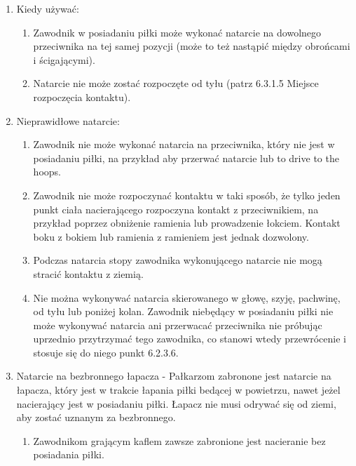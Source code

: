 \documentclass[12pt]{article}
\begin{document}
\begin{enumerate}
	\item
	      Kiedy używać:

	      \begin{enumerate}
		      \item
		            Zawodnik w posiadaniu piłki może wykonać natarcie na dowolnego
		            przeciwnika na tej samej pozycji (może to też nastąpić między
		            obrońcami i ścigającymi).
		      \item
		            Natarcie nie może zostać rozpoczęte od tyłu (patrz 6.3.1.5 Miejsce
		            rozpoczęcia kontaktu).
	      \end{enumerate}
	\item
	      Nieprawidłowe natarcie:

	      \begin{enumerate}
		      \item
		            Zawodnik nie może wykonać natarcia na przeciwnika, który nie jest w
		            posiadaniu piłki, na przykład aby przerwać natarcie lub to drive to
		            the hoops.
		      \item
		            Zawodnik nie może rozpoczynać kontaktu w taki sposób, że tylko jeden
		            punkt ciała nacierającego rozpoczyna kontakt z przeciwnikiem, na
		            przykład poprzez obniżenie ramienia lub prowadzenie łokciem. Kontakt
		            boku z bokiem lub ramienia z ramieniem jest jednak dozwolony.
		      \item
		            Podczas natarcia stopy zawodnika wykonującego natarcie nie mogą
		            stracić kontaktu z ziemią.
		      \item
		            Nie można wykonywać natarcia skierowanego w głowę, szyję, pachwinę,
		            od tyłu lub poniżej kolan. Zawodnik niebędący w posiadaniu piłki nie
		            może wykonywać natarcia ani przerwacać przeciwnika nie próbując
		            uprzednio przytrzymać tego zawodnika, co stanowi wtedy przewrócenie
		            i stosuje się do niego punkt 6.2.3.6.
	      \end{enumerate}
	\item
	      Natarcie na bezbronnego łapacza - Pałkarzom zabronone jest natarcie na
	      łapacza, który jest w trakcie łapania piłki bedącej w powietrzu, nawet
	      jeżel nacierający jest w posiadaniu piłki. Łapacz nie musi odrywać się
	      od ziemi, aby zostać uznanym za bezbronnego.

	      \begin{enumerate}
		      \item
		            Zawodnikom grającym kaflem zawsze zabronione jest nacieranie bez
		            posiadania piłki.
	      \end{enumerate}
\end{enumerate}
\end{document}
